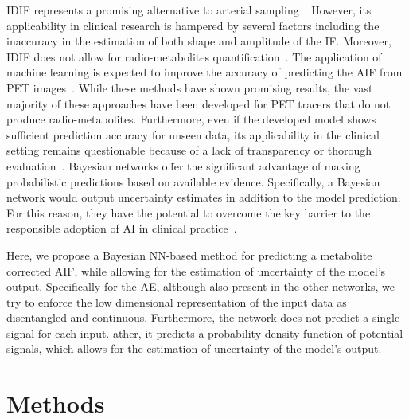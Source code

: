         \gls{IDIF} represents a promising alternative to arterial sampling~\parencite{Zanotti-Fregonara2011}. However, its applicability in clinical research is hampered by several factors including the inaccuracy in the estimation of both shape and amplitude of the \gls{IF}. Moreover, \gls{IDIF} does not allow for radio-metabolites quantification~\parencite{Sari2018Non-invasive11C-SB201745}. The application of machine learning is expected to improve the accuracy of predicting the \gls{AIF} from \gls{PET} images~\parencite{Kuttner2020, Ferrante2022PhysicallyImaging}. While these methods have shown promising results, the vast majority of these approaches have been developed for \gls{PET} tracers that do not produce radio-metabolites. Furthermore, even if the developed model shows sufficient prediction accuracy for unseen data, its applicability in the clinical setting remains questionable because of a lack of transparency or thorough evaluation~\parencite{Salahuddin2022TransparencyMethods}. Bayesian networks offer the significant advantage of making probabilistic predictions based on available evidence. Specifically, a Bayesian network would output uncertainty estimates in addition to the model prediction. For this reason, they have the potential to overcome the key barrier to the responsible adoption of \gls{AI} in clinical practice~\parencite{Prabhudesai2023LoweringAI}. 
        
        Here, we propose a Bayesian \gls{NN}-based method for predicting a metabolite corrected \gls{AIF}, while allowing for the estimation of uncertainty of the model's output. Specifically for the \gls{AE}, although also present in the other networks, we try to enforce the low dimensional representation of the input data as disentangled and continuous. Furthermore, the network does not predict a single signal for each input. ather, it predicts a probability density function of potential signals, which allows for the estimation of uncertainty of the model's output.
        
    \section{Methods}\label{sec:a_bayesian_neural_network-based_method_for_the_extraction_of_a_metabolite_corrected_arterial_input_function_from_dynamic_pbr28_pet_appendix_methods}
